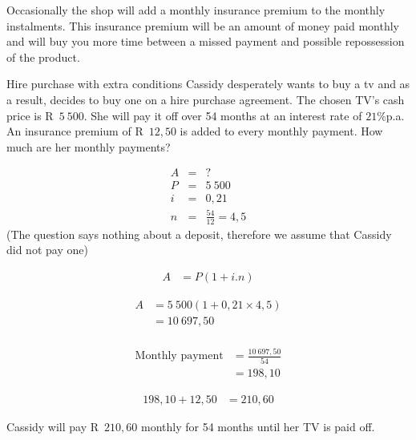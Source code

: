 Occasionally the shop will add a monthly insurance premium to the monthly instalments. This insurance premium will be an amount of money paid monthly and will buy you more time between a missed payment and possible repossession of the product.


\begin{wex}{Hire purchase with extra conditions}{
    Cassidy desperately wants to buy a tv and as a result, decides to buy one on a hire purchase agreement. The chosen TV’s cash price is R~$5~500$. She will pay it off over 54 months at an interest rate of $21\%$p.a. An insurance premium of R~$12,50$ is added to every monthly payment. How much are her monthly payments?}{

    \begin{eqnarray*}
	A &=& ?\\
	P &=& 5~500\\
	i &=& 0,21\\
	n &=& \frac{54}{12} = 4,5
    \end{eqnarray*}
(The question says nothing about a deposit, therefore we assume that Cassidy did not pay one)

    \begin{align*}
	    A &= P(1 + i . n)
    \end{align*}

    \begin{align*}
	A &= 5~500(1 + 0,21 \times 4,5)\\
	  &= 10~697,50\\
    \end{align*}

    \begin{align*}
	\text{Monthly payment} &= \frac{10~697,50}{54}\\
			&= 198,10
    \end{align*}

    \begin{align*}
	198,10 + 12,50 &= 210,60
    \end{align*}

    Cassidy will pay R~$210,60$ monthly for 54 months until her TV is paid off.
}
\end{wex}




